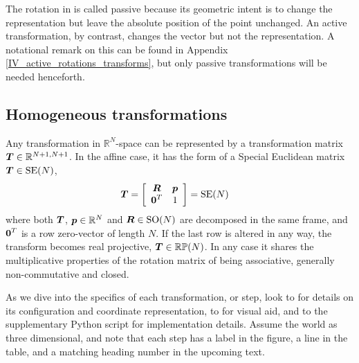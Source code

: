 The rotation in  is called passive because its geometric intent is to change the representation but leave the absolute position of the point unchanged. An active transformation, by contrast, changes the vector but not the representation. A notational remark on this can be found in Appendix \ref{IV_active_rotations_transforms}, but only passive transformations will be needed henceforth.


\subsection{Homogeneous transformations}

Any transformation in $\mathbb{R}^N$-space can be represented by a transformation matrix $\boldsymbol{T} \in \mathbb{R}^{N+1,N+1}$. In the affine case, it has the form of a Special Euclidean matrix $\boldsymbol{T}\in\mathrm{SE}(N)$,
%
\begin{align}
\dvec{T} &= 
\left[\begin{array}{c c}
 \mat{R}  & \dvec{p} \\%
 \dvec{0}^T  &  1
\end{array}\right] = \mathrm{SE}(N)\label{eq_homogeneous_affine_transform}
\end{align}
%
where both $\boldsymbol{T}$, $\boldsymbol{p}\in\mathbb{R}^N$ and $\boldsymbol{R}\in\mathrm{SO}(N)$ are decomposed in the same frame, and $\boldsymbol{0}^T$ is a row zero-vector of length $N$. If the last row is altered in any way, the transform becomes real projective, $\boldsymbol{T}\in\mathbb{RP}(N)$. In any case it shares the multiplicative properties of the rotation matrix of being associative, generally non-commutative and closed. %

As we dive into the specifics of each transformation, or step, look to  for details on its configuration and coordinate representation, to  for visual aid, and to the supplementary Python script for implementation details. Assume the world as three dimensional, and note that each step has a label in the figure, a line in the table, and a matching heading number in the upcoming text.



